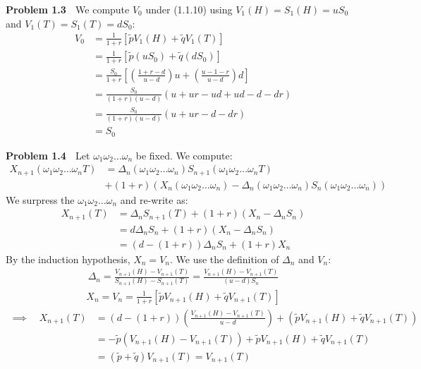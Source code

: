 \documentclass[12pt, letterpaper]{article}
\begin{document}
\vspace{5mm}
\noindent
\textbf{Problem 1.3} $\;$ We compute $V_0$ under (1.1.10) using $V_1(H) = S_1(H) = uS_0$ and $V_1(T) = S_1(T) = dS_0$:
\begin{align*}
    V_0 &= \frac{1}{1+r} \left[ \tilde p V_1(H) + \tilde q V_1(T) \right] \\
    &= \frac{1}{1+r} \left[ \tilde p (uS_0) + \tilde q (dS_0) \right] \\
    &= \frac{S_0}{1+r} \left[ \left( \frac{1+r - d}{u-d} \right) u + \left( \frac{u-1-r}{u-d} \right) d \right] \\
    &= \frac{S_0}{(1+r)(u-d)} \left( u +ur - ud + ud - d - dr \right) \\
    &= \frac{S_0}{(1+r)(u-d)} \left( u +ur - d - dr \right) \\
    &= S_0
\end{align*}
\rightline{$\square$}

\vspace{5mm}
\noindent
\textbf{Problem 1.4} $\;$ Let $\omega_1 \omega_2 \dots \omega_n$ be fixed. We compute:
\begin{align*}
    X_{n+1}(\omega_1 \omega_2 \dots \omega_n T) &= \Delta_n(\omega_1 \omega_2 \dots \omega_n) S_{n+1}(\omega_1 \omega_2 \dots \omega_n T) \\
    &+ (1+r) \left( X_n(\omega_1 \omega_2 \dots \omega_n)- \Delta_n(\omega_1 \omega_2 \dots \omega_n) S_n(\omega_1 \omega_2 \dots \omega_n) \right)
\end{align*}
We surpress the $\omega_1 \omega_2 \dots \omega_n$ and re-write as:
\begin{align*}
    X_{n+1}(T) &= \Delta_n S_{n+1}(T) + (1+r) \left( X_n- \Delta_n S_n \right) \\
    &= d \Delta_n S_n + (1+r) \left( X_n- \Delta_n S_n \right) \\
    &= \left(d-(1+r)\right)\Delta_n S_n + (1+r)X_n
\end{align*}
By the induction hypothesis, $X_n = V_n$.
We use the definition of $\Delta_n$ and $V_n$:
\begin{gather*}
    \Delta_n = \frac{V_{n+1}(H)-V_{n+1}(T)}{S_{n+1}(H)- S_{n+1}(T)} = \frac{V_{n+1}(H)-V_{n+1}(T)}{(u-d)S_n}
\end{gather*}
\begin{gather*}
    X_n = V_n = \frac{1}{1+r}\left[ \tilde p V_{n+1}(H) + \tilde q V_{n+1}(T)\right]
\end{gather*}
\begin{align*}
    \implies \quad X_{n+1}(T) &= \left(d-(1+r)\right) \left( \frac{V_{n+1}(H)-V_{n+1}(T)}{u-d} \right) + \left( \tilde p V_{n+1}(H) + \tilde q V_{n+1}(T) \right) \\
    &= -\tilde p \left(V_{n+1}(H)-V_{n+1}(T) \right) + \tilde p V_{n+1}(H) + \tilde q V_{n+1}(T) \\
    &= (\tilde p + \tilde q)V_{n+1}(T) = V_{n+1}(T)
\end{align*}
\rightline{$\square$}
\end{document}
